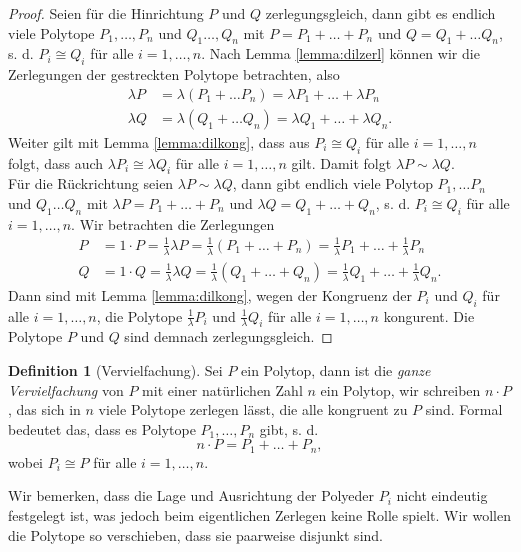 \documentclass[11pt,titlepage]{article}
\theoremstyle{definition}
\newtheorem{definition}[theorem]{Definition}
\theoremstyle{remark}
\begin{document}
	\begin{proof}
		Seien für die Hinrichtung $P$ und $Q$ zerlegungsgleich, dann gibt 
		es endlich viele Polytope $P_1,\ldots,P_n$ und $Q_1\ldots,Q_n$ mit 
		$P=P_1+\ldots+P_n$ und $Q=Q_1+\ldots Q_n$, s. d. $P_i\cong Q_i$ 
		für alle $i=1,\ldots, n$. Nach Lemma \ref{lemma:dilzerl} können wir 
		die Zerlegungen der gestreckten Polytope betrachten, also
		\begin{align*}
			\lambda P&=\lambda (P_1+\ldots P_n)=\lambda P_1 +\ldots+\lambda P_n \\
			\lambda Q&=\lambda (Q_1+\ldots Q_n)=\lambda Q_1 +\ldots+\lambda Q_n.
		\end{align*}
		Weiter gilt mit Lemma \ref{lemma:dilkong}, dass aus $P_i\cong Q_i$ 
		für alle $i=1,\ldots,n$ folgt, dass auch $\lambda P_i\cong\lambda Q_i$ 
		für alle $i=1,\ldots,n$ gilt. Damit folgt $\lambda P\sim \lambda Q$. \\
		Für die Rückrichtung seien $\lambda P\sim \lambda Q$, dann gibt 
		endlich viele Polytop $P_1,\ldots P_n$ und $Q_1\ldots Q_n$ mit 
		$\lambda P=P_1+\ldots+P_n$ und $\lambda Q=Q_1+\ldots+Q_n$, s. d. 
		$P_i\cong Q_i$ für alle $i=1,\ldots,n$. Wir betrachten die 
		Zerlegungen
		\begin{align*}
			P&=1\cdot P=\frac{1}{\lambda}\lambda P=\frac{1}{\lambda}(P_1+\ldots+P_n)
			=\frac{1}{\lambda}P_1+\ldots+\frac{1}{\lambda}P_n \\
			Q&=1\cdot Q=\frac{1}{\lambda}\lambda Q=\frac{1}{\lambda}(Q_1+\ldots+Q_n)
			=\frac{1}{\lambda}Q_1+\ldots+\frac{1}{\lambda}Q_n.
		\end{align*}
		Dann sind mit Lemma \ref{lemma:dilkong}, wegen der Kongruenz der $P_i$ und 
		$Q_i$ für alle $i=1,\ldots,n$, die Polytope $\frac{1}{\lambda}P_i$ und 
		$\frac{1}{\lambda}Q_i$ für alle $i=1,\ldots,n$ kongurent. 
		Die Polytope $P$ und $Q$ sind demnach zerlegungsgleich.
	\end{proof}
	
	\begin{definition}[Vervielfachung]
		Sei $P$ ein Polytop, dann ist die \textsl{ganze Vervielfachung} 
		von $P$ mit 
		einer natürlichen Zahl $n$ ein Polytop, wir schreiben $n\cdot P$, 
		das sich in $n$ viele Polytope zerlegen lässt, die alle kongruent zu 
		$P$ sind. Formal bedeutet das, dass es Polytope $P_1,\ldots,P_n$ gibt, s. d.
		\[n\cdot P=P_1+\ldots+P_n,\]
		wobei $P_i\cong P$ für alle $i=1,\ldots,n$.
	\end{definition}
	
	Wir bemerken, dass die Lage und Ausrichtung der Polyeder $P_i$ nicht 
	eindeutig festgelegt 
	ist, was jedoch beim eigentlichen Zerlegen keine Rolle spielt. Wir wollen 
	die Polytope so verschieben, dass sie paarweise disjunkt sind.
	
\end{document}
